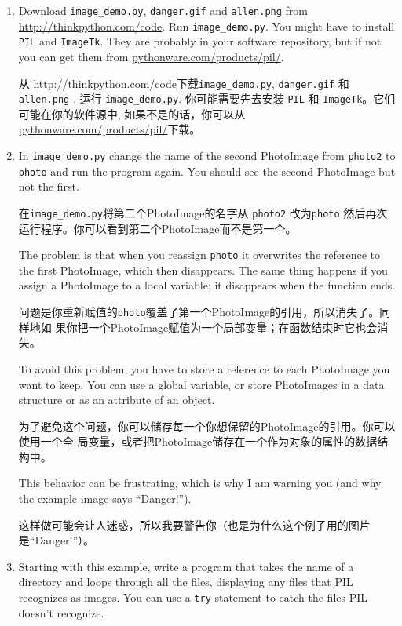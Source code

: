 \documentclass[10pt]{book}
\begin{document}
\begin{CJK}{UTF8}{gbsn}
\begin{exercise}
\begin{enumerate}

\item Download \verb"image_demo.py", \verb"danger.gif" and \verb"allen.png"
from \url{http://thinkpython.com/code}.  Run \verb"image_demo.py".  You
might have to install {\tt PIL} and {\tt ImageTk}.  
They are probably in your software repository,  but if not
you can get them from \url{pythonware.com/products/pil/}.


从 \url{http://thinkpython.com/code}下载\verb"image_demo.py", \verb"danger.gif"
和 \verb"allen.png" .  运行 \verb"image_demo.py".  你可能需要先去安装 {\tt PIL}
和 {\tt ImageTk}。它们可能在你的软件源中,  如果不是的话，你可以从
\url{pythonware.com/products/pil/}下载。

\item In \verb"image_demo.py" change the name of the second
PhotoImage from {\tt photo2} to {\tt photo} and run the program
again.  You should see the second PhotoImage but not the first.

在\verb"image_demo.py"将第二个PhotoImage的名字从 {\tt photo2} 改为{\tt photo}
然后再次运行程序。你可以看到第二个PhotoImage而不是第一个。

The problem is that when you reassign {\tt photo} it overwrites
the reference to the first PhotoImage, which then disappears.  The
same thing happens if you assign a PhotoImage to a local
variable; it disappears when the function ends.

问题是你重新赋值的{\tt photo}覆盖了第一个PhotoImage的引用，所以消失了。同样地如
果你把一个PhotoImage赋值为一个局部变量；在函数结束时它也会消失。

To avoid this problem, you have to store a reference to each
PhotoImage you want to keep.  You can use a global variable, or
store PhotoImages in a data structure or as an attribute of
an object.

为了避免这个问题，你可以储存每一个你想保留的PhotoImage的引用。你可以使用一个全
局变量，或者把PhotoImage储存在一个作为对象的属性的数据结构中。

This behavior can be frustrating, which is why I am warning
you (and why the example image says ``Danger!'').

这样做可能会让人迷惑，所以我要警告你（也是为什么这个例子用的图片是``Danger!''）。

\item Starting with this example, write a program that takes
the name of a directory and loops through all the files, displaying
any files that PIL recognizes as images.  You can use a {\tt try}
statement to catch the files PIL doesn't recognize.


\end{enumerate}
\end{exercise}
\end{CJK}
\end{document}
